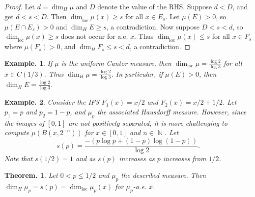 \documentclass[11pt, a4paper]{memoir}
\DeclareMathOperator{\N}{{\mathbb{N}}}
\theoremstyle{change}
\newtheorem{theorem}{Theorem.}[section]
\theoremstyle{plain}
\theoremstyle{nonumberplain}
\newtheorem{example}{Example.}
\newtheorem{proof}{Proof}
\DeclareMathOperator{\loc}{loc}
\numberwithin{equation}{section}
\begin{document}
\begin{proof}
    Let $d=\dim_H\mu$ and $D$ denote the value of the RHS.
    Suppose $d<D$, and get $d<s<D$.
    Then $\underline{\dim}_{\loc}\mu(x)\geq s$ for all $x\in E_s$.
    Let $\mu(E)>0$, so $\mu(E\cap E_s)>0$ and $\dim_H E\geq s$, a contradiction.
    Now suppose $D<s<d$, so $\underline{\dim}_{\loc}\mu(x)\geq s$ does not occur for a.e. $x$.
    Thus $\underline{\dim}_{\loc}\mu(x)\leq s$ for all $x\in F_s$ where $\mu(F_s)>0$, and $\dim_H F_s\leq s<d$, a contradiction.
\end{proof}
\begin{example}
    If $\mu$ is the uniform Cantor measure, then $\dim_{\loc}\mu = \frac{\log 2}{\log 3}$ for all $x\in C(1/3)$.
    Thus $\dim_H\mu=\frac{\log 2}{\log 3}$.
    In particular, if $\mu(E)>0$, then $\dim_H E=\frac{\log 2}{\log 3}$.
\end{example}
\begin{example}
    Consider the IFS $F_1(x)=x/2$ and $F_2(x)=x/2+1/2$.
    Let $p_1=p$ and $p_2=1-p$, and $\mu_p$ the associated Hausdorff measure.
    However, since the images of $[0,1]$ are not positively separated, it is more challenging to compute $\mu(B(x,2^{-n}))$ for $x\in[0,1]$ and $n\in\N$.
    Let
    \begin{equation*}
        s(p) = \frac{-(p\log p+(1-p)\log(1-p))}{\log 2}.
    \end{equation*}
    Note that $s(1/2)=1$ and as $s(p)$ increases as $p$ increases from $1/2$.
\end{example}
\begin{theorem}
    Let $0<p\leq 1/2$ and $\mu_p$ the described measure.
    Then $\dim_H\mu_p=s(p)=\dim_{\loc}\mu_p(x)$ for $\mu_p$-a.e. $x$.
\end{theorem}
\end{document}
